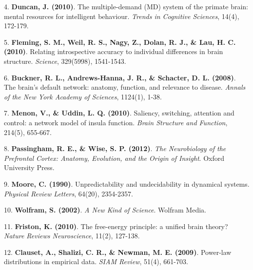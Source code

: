 \documentclass[11pt,a4paper,oneside]{ctexart}
\begin{document}
4. \textbf{Duncan, J. (2010)}. The multiple-demand (MD) system of the primate brain: mental resources for intelligent behaviour. \textit{Trends in Cognitive Sciences}, 14(4), 172-179.

5. \textbf{Fleming, S. M., Weil, R. S., Nagy, Z., Dolan, R. J., \& Lau, H. C. (2010)}. Relating introspective accuracy to individual differences in brain structure. \textit{Science}, 329(5998), 1541-1543.

6. \textbf{Buckner, R. L., Andrews-Hanna, J. R., \& Schacter, D. L. (2008)}. The brain's default network: anatomy, function, and relevance to disease. \textit{Annals of the New York Academy of Sciences}, 1124(1), 1-38.

7. \textbf{Menon, V., \& Uddin, L. Q. (2010)}. Saliency, switching, attention and control: a network model of insula function. \textit{Brain Structure and Function}, 214(5), 655-667.

8. \textbf{Passingham, R. E., \& Wise, S. P. (2012)}. \textit{The Neurobiology of the Prefrontal Cortex: Anatomy, Evolution, and the Origin of Insight}. Oxford University Press.

9. \textbf{Moore, C. (1990)}. Unpredictability and undecidability in dynamical systems. \textit{Physical Review Letters}, 64(20), 2354-2357.

10. \textbf{Wolfram, S. (2002)}. \textit{A New Kind of Science}. Wolfram Media.

11. \textbf{Friston, K. (2010)}. The free-energy principle: a unified brain theory? \textit{Nature Reviews Neuroscience}, 11(2), 127-138.

12. \textbf{Clauset, A., Shalizi, C. R., \& Newman, M. E. (2009)}. Power-law distributions in empirical data. \textit{SIAM Review}, 51(4), 661-703.
\end{document}

